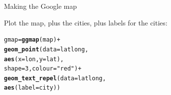 \documentclass[unknownkeysallowed]{beamer}\usepackage[]{graphicx}\usepackage[]{color}
\makeatletter
\newcommand{\hlnum}[1]{\textcolor[rgb]{0.686,0.059,0.569}{#1}}%
\newcommand{\hlstr}[1]{\textcolor[rgb]{0.192,0.494,0.8}{#1}}%
\newcommand{\hlopt}[1]{\textcolor[rgb]{0,0,0}{#1}}%
\newcommand{\hlstd}[1]{\textcolor[rgb]{0.345,0.345,0.345}{#1}}%
\newcommand{\hlkwb}[1]{\textcolor[rgb]{0.69,0.353,0.396}{#1}}%
\newcommand{\hlkwc}[1]{\textcolor[rgb]{0.333,0.667,0.333}{#1}}%
\newcommand{\hlkwd}[1]{\textcolor[rgb]{0.737,0.353,0.396}{\textbf{#1}}}%
\newenvironment{kframe}{%
 \def\at@end@of@kframe{}%
 \ifinner\ifhmode%
  \def\at@end@of@kframe{\end{minipage}}%
  \begin{minipage}{\columnwidth}%
 \fi\fi%
 \def\FrameCommand##1{\hskip\@totalleftmargin \hskip-\fboxsep
 \colorbox{shadecolor}{##1}\hskip-\fboxsep
     \hskip-\linewidth \hskip-\@totalleftmargin \hskip\columnwidth}%
 \MakeFramed {\advance\hsize-\width
   \@totalleftmargin\z@ \linewidth\hsize
   \@setminipage}}%
 {\par\unskip\endMakeFramed%
 \at@end@of@kframe}
\newenvironment{knitrout}{}{} %
\makeatother
\begin{document}
\begin{frame}[fragile]{Making the Google map}
  
  Plot the map, plus the cities, plus labels for the cities:
  
\begin{knitrout}
\color{fgcolor}\begin{kframe}
\begin{alltt}
\hlstd{gmap} \hlkwb{=} \hlkwd{ggmap}\hlstd{(map)}\hlopt{+}
       \hlkwd{geom_point}\hlstd{(}\hlkwc{data}\hlstd{=latlong,}
                  \hlkwd{aes}\hlstd{(}\hlkwc{x}\hlstd{=lon,}\hlkwc{y}\hlstd{=lat),}
                  \hlkwc{shape}\hlstd{=}\hlnum{3}\hlstd{,}\hlkwc{colour}\hlstd{=}\hlstr{"red"}\hlstd{)}\hlopt{+}
       \hlkwd{geom_text_repel}\hlstd{(}\hlkwc{data}\hlstd{=latlong,}
                       \hlkwd{aes}\hlstd{(}\hlkwc{label}\hlstd{=city))}
\end{alltt}
\end{kframe}
\end{knitrout}
  
\end{frame}
\end{document}
